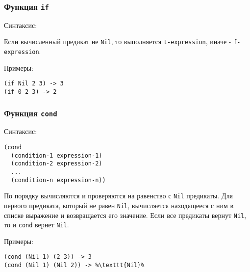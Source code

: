 \subsubsection*{Функция \texttt{if}}

Синтаксис: 

Если вычисленный предикат не \texttt{Nil}, то выполняется \texttt{t-expression}, иначе - \texttt{f-expression}.

Примеры:

\begin{lstlisting}[style={scheme}]
(if Nil 2 3) -> 3
(if 0 2 3) -> 2
\end{lstlisting}

\subsubsection*{Функция \texttt{cond}}

Синтаксис:
\begin{lstlisting}[style={scheme}]
(cond
  (condition-1 expression-1)
  (condition-2 expression-2)
  ...
  (condition-n expression-n))
\end{lstlisting}

По порядку вычисляются и проверяются на равенство с \texttt{Nil} предикаты. Для первого предиката, который не равен \texttt{Nil}, вычисляется находящееся с ним в списке выражение и возвращается его значение. Если все предикаты вернут \texttt{Nil}, то и \texttt{cond} вернет \texttt{Nil}.

Примеры:
\begin{lstlisting}[style={scheme}]
(cond (Nil 1) (2 3)) -> 3
(cond (Nil 1) (Nil 2)) -> %\texttt{Nil}%
\end{lstlisting}

